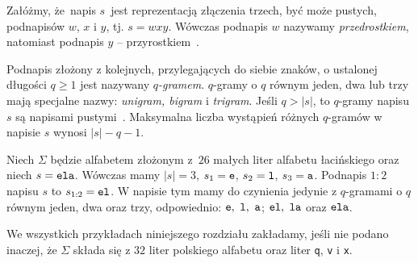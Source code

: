 \documentclass{praca1}
\begin{document}
\begin{definition}
Załóżmy, że~napis $s$~jest reprezentacją złączenia trzech, być może pustych, podnapisów $w$, $x$ i $y$, tj. $s = wxy$. Wówczas podnapis $w$ nazywamy \emph{przedrostkiem}, natomiast podnapis $y$ -- przyrostkiem~\cite{Boytsov2011:indexingmethods}.
\end{definition}

\begin{definition}
Podnapis złożony z kolejnych, przylegających do siebie znaków, o ustalonej długości $q\geq 1$ jest nazywany \emph{$q$-gramem}. $q$-gramy o $q$ równym jeden, dwa lub trzy mają specjalne nazwy: \emph{unigram, bigram} i \emph{trigram}. Jeśli $q > |s|$, to $q$-gramy napisu $s$ są napisami pustymi~\cite{Boytsov2011:indexingmethods}. Maksymalna liczba wystąpień różnych $q$-gramów w napisie $s$ wynosi $|s|-q-1$.
\end{definition}



\begin{example}
Niech $\Sigma$ będzie alfabetem złożonym z~$26$ małych liter alfabetu łacińskiego oraz niech $s = \verb|ela|$. Wówczas mamy $|s| = 3$, $s_1 = \verb|e|$, $s_2 = \verb|l|$, $s_3 = \verb|a|$. Podnapis $1\!\!:\!\!2$ napisu $s$ to $s_{1:2} = \verb|el|$. W napisie tym mamy do czynienia jedynie z $q$-gramami o $q$ równym jeden, dwa oraz trzy, odpowiednio: $\verb|e|,\ \verb|l|,\ \verb|a|$; $\verb|el|,\ \verb|la|$ oraz $\verb|ela|$.
\end{example}


We wszystkich przykładach niniejszego rozdziału zakładamy, jeśli nie podano inaczej, że $\Sigma$ składa się z $32$ liter polskiego alfabetu oraz liter \verb|q|, \verb|v| i \verb|x|.
\end{document}
